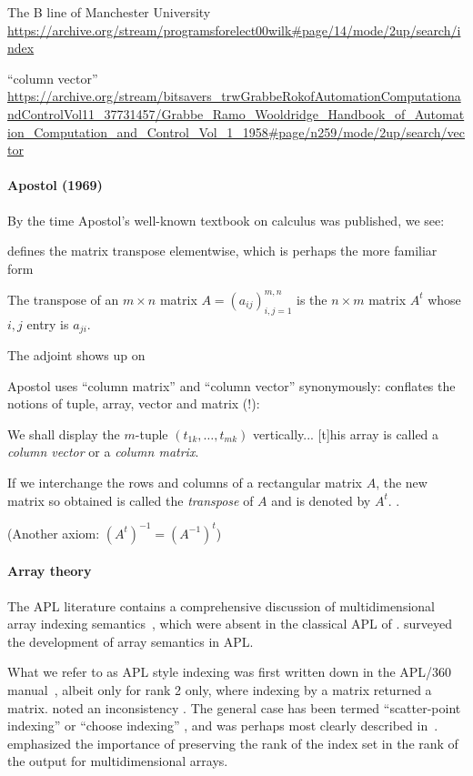The B line of Manchester University
\url{https://archive.org/stream/programsforelect00wilk#page/14/mode/2up/search/index}

“column vector”
\url{https://archive.org/stream/bitsavers_trwGrabbeRokofAutomationComputationandControlVol11_37731457/Grabbe_Ramo_Wooldridge_Handbook_of_Automation_Computation_and_Control_Vol_1_1958#page/n259/mode/2up/search/vector}


\paragraph{Apostol (1969)~\cite{Apostol1969}}

By the time Apostol's well-known textbook on calculus was published, we see:

\cite[p. 91]{Apostol1969} defines the matrix transpose elementwise, which is perhaps the more familiar form

The transpose of an $m \times n$ matrix $A = \left( a_{ij} \right)^{m,n}_{i,j=1}$ is the $n \times m$ matrix $A^t$ whose $i, j$ entry is $a_{ji}$.

The adjoint shows up on \cite[p. 122]{Apostol1969}

Apostol uses ``column matrix'' and ``column vector'' synonymously: \cite[p. 592]{Apostol1967} conflates the notions of tuple, array, vector and matrix (!):

We shall display the $m$-tuple $(t_{1k}, \dots, t_{mk})$ vertically... [t]his array is called a \textit{column vector} or a \textit{column matrix}.

If we interchange the rows and columns of a rectangular matrix $A$, the new matrix so obtained is called the \textit{transpose} of $A$ and is denoted by $A^t$. \cite[p. 615, Exercise 7]{Apostol1967}.

(Another axiom: $(A^t)^{-1} = (A^{-1})^t$)

\paragraph{Array theory} The APL literature contains a comprehensive discussion
of multidimensional array indexing semantics~\cite{Brown1982}, which were
absent in the classical APL of \cite{Iverson1962}. \cite{Ruehr1982,Gerth1988}
surveyed the development of array semantics in APL.

What we refer to as APL style indexing was first written down in the APL/360
manual~\cite{Falkoff1968}, albeit only for rank 2 only, where indexing by a
matrix returned a matrix. \cite{Haegi1976} noted an inconsistency . The general
case has been termed ``scatter-point indexing'' or ``choose indexing''
\cite{Brown1972,Ruehr1982}, and was perhaps most clearly described
in~\cite{More1979}. \cite{Gull1979} emphasized the importance of preserving
the rank of the index set in the rank of the output for multidimensional
arrays.


